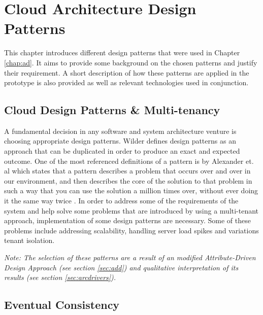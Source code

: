 \chapter{Cloud Architecture Design Patterns}

This chapter introduces different design patterns that were used in Chapter \ref{chap:ad}. It aims to provide some background on the chosen patterns and justify their requirement. A short description of how these patterns are applied in the prototype  is also provided as well as relevant technologies used in conjunction.

\section{Cloud Design Patterns \& Multi-tenancy}

A fundamental decision in any software and system architecture venture is choosing appropriate design patterns. Wilder \cite{Wilder2012-so} defines design patterns as an approach that can be duplicated in order to produce an exact and expected outcome. One of the most referenced definitions of a pattern is by Alexander et. al which states that a pattern describes a problem that occurs over and over in our environment, and then describes the core of the solution to that problem in such a way that you can use the solution a million times over, without ever doing it the same way twice \cite{Alexander1977-ni}. In order to address some of the requirements of the system and help solve some problems that are introduced by using a multi-tenant approach, implementation of some design patterns are necessary. Some of these problems include addressing scalability, handling server load spikes and variations tenant isolation. 

\textit{Note: The selection of these patterns are a result of an modified Attribute-Driven Design Approach (see section \ref{sec:add}) and qualitative interpretation of its results (see section \ref{sec:arcdrivers}).}

\section{Eventual Consistency}

